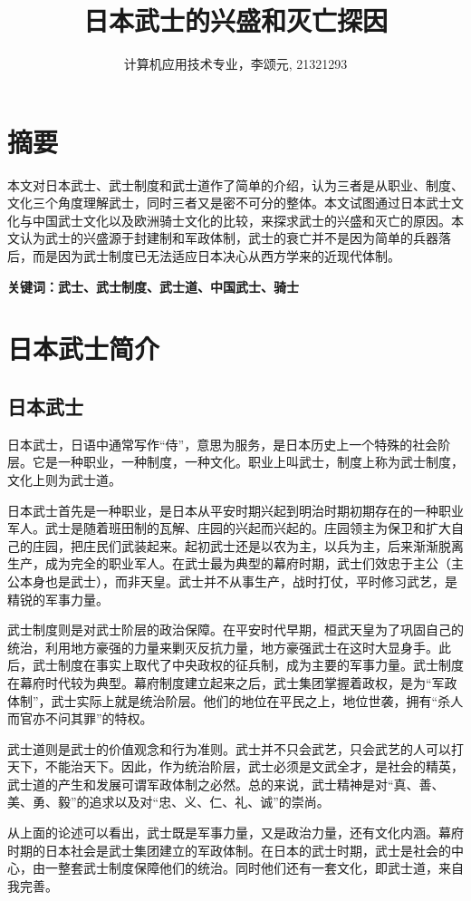 \documentclass[utf8,a4paper]{ctexart}
\title{日本武士的兴盛和灭亡探因}
\author{计算机应用技术专业，李颂元, 21321293}
\begin{document}
\maketitle
\section*{摘要}
本文对日本武士、武士制度和武士道作了简单的介绍，认为三者是从职业、制度、文化三个角度理解武士，同时三者又是密不可分的整体。本文试图通过日本武士文化与中国武士文化以及欧洲骑士文化的比较，来探求武士的兴盛和灭亡的原因。本文认为武士的兴盛源于封建制和军政体制，武士的衰亡并不是因为简单的兵器落后，而是因为武士制度已无法适应日本决心从西方学来的近现代体制。

\textbf{关键词：武士、武士制度、武士道、中国武士、骑士}
\tableofcontents
\section{日本武士简介}
\subsection{日本武士}
日本武士，日语中通常写作“侍”，意思为服务，是日本历史上一个特殊的社会阶层。它是一种职业，一种制度，一种文化。职业上叫武士，制度上称为武士制度，文化上则为武士道。

日本武士首先是一种职业，是日本从平安时期兴起到明治时期初期存在的一种职业军人。武士是随着班田制的瓦解、庄园的兴起而兴起的。庄园领主为保卫和扩大自己的庄园，把庄民们武装起来。起初武士还是以农为主，以兵为主，后来渐渐脱离生产，成为完全的职业军人\cite{zhe03}。在武士最为典型的幕府时期，武士们效忠于主公（主公本身也是武士），而非天皇。武士并不从事生产，战时打仗，平时修习武艺，是精锐的军事力量。

武士制度则是对武士阶层的政治保障。在平安时代早期，桓武天皇为了巩固自己的统治，利用地方豪强的力量来剿灭反抗力量，地方豪强武士在这时大显身手\cite{wushiriben13}。此后，武士制度在事实上取代了中央政权的征兵制，成为主要的军事力量。武士制度在幕府时代较为典型。幕府制度建立起来之后，武士集团掌握着政权，是为“军政体制”，武士实际上就是统治阶层。他们的地位在平民之上，地位世袭，拥有“杀人而官亦不问其罪”的特权\cite{zhe03}。

武士道则是武士的价值观念和行为准则。武士并不只会武艺，只会武艺的人可以打天下，不能治天下。因此，作为统治阶层，武士必须是文武全才，是社会的精英，武士道的产生和发展可谓军政体制之必然。总的来说，武士精神是对“真、善、美、勇、毅”的追求以及对“忠、义、仁、礼、诚”的崇尚\cite{wang08}。

从上面的论述可以看出，武士既是军事力量，又是政治力量，还有文化内涵。幕府时期的日本社会是武士集团建立的军政体制。在日本的武士时期，武士是社会的中心，由一整套武士制度保障他们的统治。同时他们还有一套文化，即武士道，来自我完善。
\end{document}
